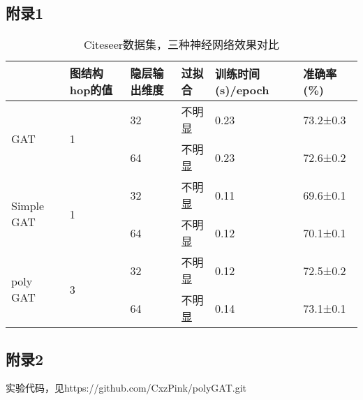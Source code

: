 \cleardoublepage

{

    \appendixsubsecmajornumbering

    \subsection{附录1}

    \begin{table}[htb]
        \centering
        \caption{Citeseer数据集，三种神经网络效果对比}
        \label{tabel6-1}
        \begin{tabular}{|l|l|l|l|l|l|}
        \hline
                                    & 图结构hop的值           & 隐层输出维度 & 过拟合 & 训练时间(s)/epoch & 准确率(\%)       \\ \hline
        \multirow{2}{*}{GAT}        & \multirow{2}{*}{1} & 32     & 不明显 & 0.23           & 73.2±0.3 \\ \cline{3-6} 
                                    &                    & 64     & 不明显 & 0.23           & 72.6±0.2 \\ \hline
        \multirow{2}{*}{Simple GAT} & \multirow{2}{*}{1} & 32     & 不明显 & 0.11           & 69.6±0.1 \\ \cline{3-6} 
                                    &                    & 64     & 不明显 & 0.12           & 70.1±0.1 \\ \hline
        \multirow{2}{*}{poly GAT}   & \multirow{2}{*}{3} & 32     & 不明显 & 0.12           & 72.5±0.2 \\ \cline{3-6} 
                                    &                    & 64     & 不明显 & 0.14           & 73.1±0.1 \\ \hline
        \end{tabular}
    \end{table}

    \subsection{附录2}

    实验代码，见https://github.com/CxzPink/polyGAT.git

    }